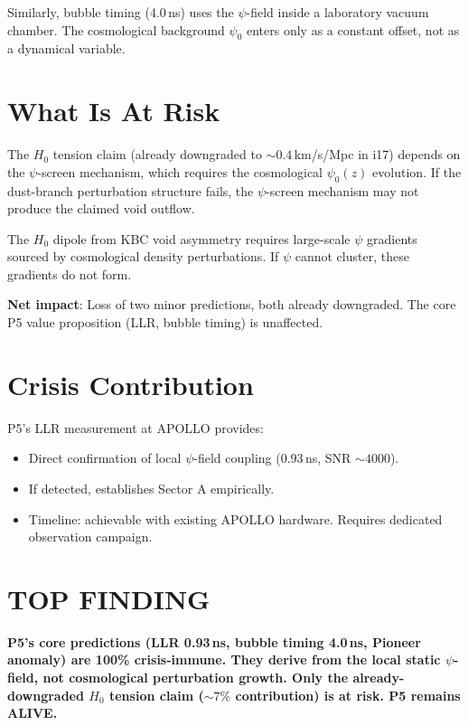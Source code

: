 \documentclass[11pt]{article}
\begin{document}
Similarly, bubble timing (4.0\,ns) uses the $\psi$-field inside a
laboratory vacuum chamber. The cosmological background $\psi_0$ enters
only as a constant offset, not as a dynamical variable.

\section{What Is At Risk}

The $H_0$ tension claim (already downgraded to $\sim 0.4$\,km/s/Mpc in
i17) depends on the $\psi$-screen mechanism, which requires the cosmological
$\psi_0(z)$ evolution. If the dust-branch perturbation structure fails,
the $\psi$-screen mechanism may not produce the claimed void outflow.

The $H_0$ dipole from KBC void asymmetry requires large-scale $\psi$
gradients sourced by cosmological density perturbations. If $\psi$
cannot cluster, these gradients do not form.

\textbf{Net impact}: Loss of two minor predictions, both already
downgraded. The core P5 value proposition (LLR, bubble timing)
is unaffected.

\section{Crisis Contribution}

P5's LLR measurement at APOLLO provides:
\begin{itemize}
\item Direct confirmation of local $\psi$-field coupling (0.93\,ns,
  SNR $\sim 4000$).
\item If detected, establishes Sector A empirically.
\item Timeline: achievable with existing APOLLO hardware. Requires
  dedicated observation campaign.
\end{itemize}

\section*{TOP FINDING}

\begin{tcolorbox}[colback=blue!5!white, colframe=blue!70!black]
\textbf{P5's core predictions (LLR 0.93\,ns, bubble timing 4.0\,ns,
Pioneer anomaly) are 100\% crisis-immune. They derive from the local
static $\psi$-field, not cosmological perturbation growth. Only the
already-downgraded $H_0$ tension claim ($\sim 7\%$ contribution) is at
risk. P5 remains ALIVE.}
\end{tcolorbox}
\end{document}

